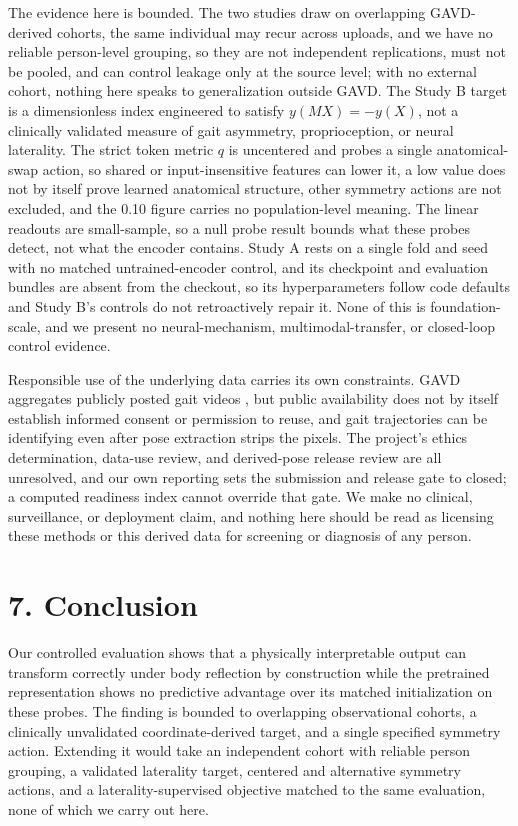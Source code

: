 \documentclass{article}
\begin{document}
The evidence here is bounded. The two studies draw on overlapping
GAVD-derived cohorts, the same individual may recur across uploads, and
we have no reliable person-level grouping, so they are not independent
replications, must not be pooled, and can control leakage only at the
source level; with no external cohort, nothing here speaks to
generalization outside GAVD. The Study B target is a dimensionless index
engineered to satisfy \(y(MX) = -y(X)\), not a clinically validated
measure of gait asymmetry, proprioception, or neural laterality. The
strict token metric \(q\) is uncentered and probes a single
anatomical-swap action, so shared or input-insensitive features can
lower it, a low value does not by itself prove learned anatomical
structure, other symmetry actions are not excluded, and the 0.10 figure
carries no population-level meaning. The linear readouts are
small-sample, so a null probe result bounds what these probes detect,
not what the encoder contains. Study A rests on a single fold and seed
with no matched untrained-encoder control, and its checkpoint and
evaluation bundles are absent from the checkout, so its hyperparameters
follow code defaults and Study B's controls do not retroactively repair
it. None of this is foundation-scale, and we present no
neural-mechanism, multimodal-transfer, or closed-loop control evidence.

Responsible use of the underlying data carries its own constraints. GAVD
aggregates publicly posted gait videos
\citep{ranjan2025gavd, gavdRepo2026}, but public availability does not
by itself establish informed consent or permission to reuse, and gait
trajectories can be identifying even after pose extraction strips the
pixels. The project's ethics determination, data-use review, and
derived-pose release review are all unresolved, and our own reporting
sets the submission and release gate to closed; a computed readiness
index cannot override that gate. We make no clinical, surveillance, or
deployment claim, and nothing here should be read as licensing these
methods or this derived data for screening or diagnosis of any person.

\section{7. Conclusion}\label{conclusion}

Our controlled evaluation shows that a physically interpretable output
can transform correctly under body reflection by construction while the
pretrained representation shows no predictive advantage over its matched
initialization on these probes. The finding is bounded to overlapping
observational cohorts, a clinically unvalidated coordinate-derived
target, and a single specified symmetry action. Extending it would take
an independent cohort with reliable person grouping, a validated
laterality target, centered and alternative symmetry actions, and a
laterality-supervised objective matched to the same evaluation, none of
which we carry out here.
\end{document}
